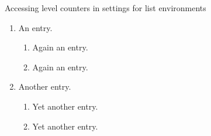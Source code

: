 \begin{showlatex}{Accessing level counters in settings for list environments}
\begin{enumerate}
  \item
    An entry.
    \begin{enumerate}
      \item
        Again an entry.
      \item
        Again an entry.
    \end{enumerate}
  \item
    Another entry.
    \begin{enumerate}
      \item
        Yet another entry.
      \item
        Yet another entry.
    \end{enumerate}
\end{enumerate}
\end{showlatex}
  
